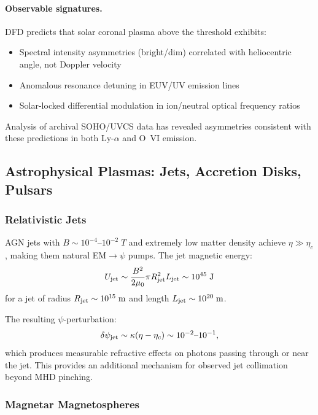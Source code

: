 \documentclass[aps,prd,twocolumn,superscriptaddress,floatfix,nofootinbib]{revtex4-2}
\begin{document}
\paragraph{Observable signatures.}
DFD predicts that solar coronal plasma above the threshold exhibits:
\begin{itemize}[nosep]
\item Spectral intensity asymmetries (bright/dim) correlated with
heliocentric angle, not Doppler velocity
\item Anomalous resonance detuning in EUV/UV emission lines
\item Solar-locked differential modulation in ion/neutral optical
frequency ratios
\end{itemize}

Analysis of archival SOHO/UVCS data has revealed asymmetries consistent
with these predictions in both Ly-$\alpha$ and O~VI emission.

\subsection{Astrophysical Plasmas: Jets, Accretion Disks, Pulsars}

\subsubsection{Relativistic Jets}

AGN jets with $B \sim 10^{-4}$--$10^{-2}\;\si{T}$ and extremely low
matter density achieve $\eta \gg \eta_c$, making them natural
EM$\to\psi$ pumps. The jet magnetic energy:
\begin{equation}
U_{\rm jet} \sim \frac{B^2}{2\mu_0}\pi R_{\rm jet}^2 L_{\rm jet}
\sim 10^{45}\;\si{J}
\end{equation}
for a jet of radius $R_{\rm jet} \sim 10^{15}\;\si{m}$ and length
$L_{\rm jet} \sim 10^{20}\;\si{m}$.

The resulting $\psi$-perturbation:
\begin{equation}
\delta\psi_{\rm jet} \sim \kappa(\eta - \eta_c)
\sim 10^{-2}\text{--}10^{-1},
\end{equation}
which produces measurable refractive effects on photons passing through
or near the jet. This provides an additional mechanism for observed
jet collimation beyond MHD pinching.

\subsubsection{Magnetar Magnetospheres}
\end{document}
